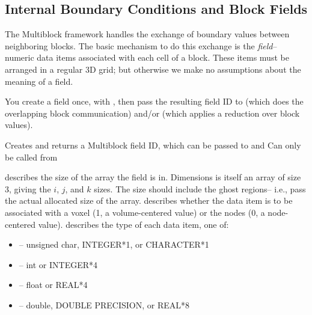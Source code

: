 \documentclass[10pt]{article}
\begin{document}
\subsection{Internal Boundary Conditions and Block Fields}

The Multiblock framework handles the exchange of boundary values 
between neighboring blocks.
The basic mechanism to do this exchange is the {\em field}-- numeric data items 
associated with each cell of a block. These items must be arranged in a regular
3D grid; but otherwise we make no assumptions about the meaning of a
field.

You create a field once, with , then pass the resulting 
field ID to  (which does the
overlapping block communication) and/or  (which 
applies a reduction over block values).


\vspace{0.2in}
     Creates and returns a Multiblock field ID, which can be passed to
 and   Can only be called from

      describes the size of the array the field is in.
	Dimensions is itself an array of size 3, giving the $i$, $j$, and $k$ sizes.
	The size should include the ghost regions-- i.e., pass the actual allocated
	size of the array.
      describes whether the data item is to be associated with
	a voxel (1, a volume-centered value) or the nodes (0, a node-centered
	value). 
      describes the type of each data item, one of:

     \begin{itemize}
        \item {}-- unsigned char, INTEGER*1, or CHARACTER*1
        \item {}-- int or INTEGER*4
        \item {}-- float or REAL*4
        \item {}-- double, DOUBLE PRECISION, or REAL*8
     \end{itemize}
\end{document}
